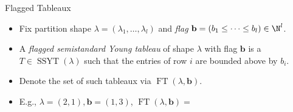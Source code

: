 \documentclass[dvipsnames]{beamer}
\DeclareMathOperator{\SSYT}{SSYT}
\DeclareMathOperator{\FT}{FT}
\newcommand{\bb}{{\mathbf b}}
\theoremstyle{definition}
\newcounter{c}
\begin{document}
\begin{frame}{Flagged Tableaux}
  \begin{itemize}
  \item Fix partition shape \(\lambda = (\lambda_1,\ldots,\lambda_l)\)
    and \emph{flag} \(\bb = (b_1 \leq \cdots \leq b_l) \in \N^l\).\pause
   \item A \emph{flagged semistandard Young tableau} of shape \(\lambda\)
    with flag \(\bb\) is a \(T \in \SSYT(\lambda)\) such that the
    entries of row \(i\) are bounded above by \(b_i\).
   \item Denote the set of such tableaux via \(\FT(\lambda,\bb)\).
   \item E.g., \(\lambda = (2,1), \bb = (1,3)\), \(\FT(\lambda,\bb) = \)
  \end{itemize}
  \begin{center}
  \end{center}
\end{frame}
\end{document}
